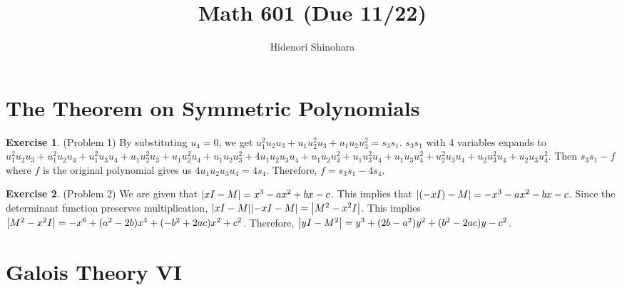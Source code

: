 \documentclass[12pt, psamsfonts]{amsart}
\theoremstyle{definition}
\newtheorem*{exer}{Exercise}
\theoremstyle{remark}
\numberwithin{equation}{section}
\begin{document}
\title{Math 601 (Due 11/22)}
\author{Hidenori Shinohara}
\maketitle

\tableofcontents
\section{The Theorem on Symmetric Polynomials}

\begin{exer}{(Problem 1)}
  By substituting $u_4 = 0$, we get $u_1^2u_2u_3 + u_1u_2^2u_3 + u_1u_2u_3^2 = s_3s_1$.
  $s_3s_1$ with 4 variables expands to $u_{1}^{2} u_{2} u_{3} + u_{1}^{2} u_{2} u_{4} + u_{1}^{2} u_{3} u_{4} + u_{1} u_{2}^{2} u_{3} + u_{1} u_{2}^{2} u_{4} + u_{1} u_{2} u_{3}^{2} + 4 u_{1} u_{2} u_{3} u_{4} + u_{1} u_{2} u_{4}^{2} + u_{1} u_{3}^{2} u_{4} + u_{1} u_{3} u_{4}^{2} + u_{2}^{2} u_{3} u_{4} + u_{2} u_{3}^{2} u_{4} + u_{2} u_{3} u_{4}^{2}$.
  Then $s_3s_1 - f$ where $f$ is the original polynomial gives us $4u_1u_2u_3u_4 = 4s_4$.
  Therefore, $f = s_3s_1 - 4s_4$.
\end{exer}

\begin{exer}{(Problem 2)}
  We are given that $\abs{xI - M} = x^3 - ax^2 + bx - c$.
  This implies that $\abs{(-xI) - M} = -x^3 - ax^2 - bx - c$.
  Since the determinant function preserves multiplication, $\abs{xI - M}\abs{-xI - M} = \abs{M^2 - x^2I}$.
  This implies $\abs{M^2 - x^2I} = -x^6 + (a^2 - 2b)x^4 + (-b^2 + 2ac)x^2 + c^2$.
  Therefore, $\abs{yI - M^2} = y^3 + (2b - a^2)y^2 + (b^2 - 2ac)y - c^2$.
\end{exer}

\section{Galois Theory VI}
\end{document}
